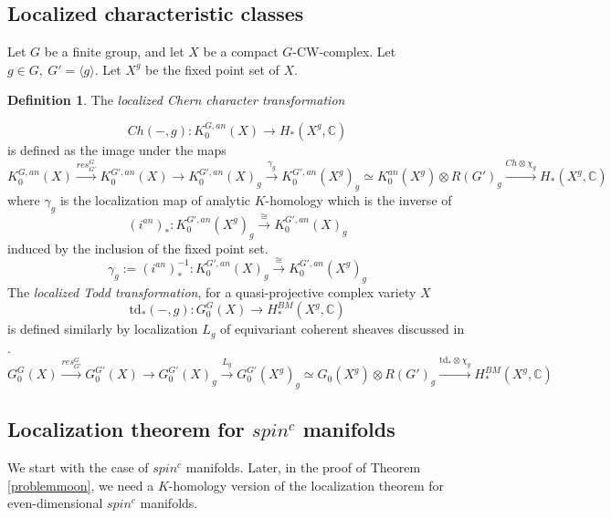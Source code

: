\documentclass[11pt,leqno,twoside]{amsart}
\theoremstyle{plainsl}
\theoremstyle{definition}
\newtheorem{definition}[theorem]{Definition}
\newcommand{\td}{\mathrm{td}}
\begin{document}
\subsection{Localized characteristic classes}


Let $G$ be a finite group, and let $X$ be a compact $G$-CW-complex. Let $g\in G,\:G'=\langle g\rangle$. Let $X^g$ be the fixed point set of $X$.
\begin{definition}\cite{A} \label{localizedchernclass} The \textit{localized Chern character transformation}

\[Ch(-,g):K_0^{G,an}(X) \rightarrow H_*(X^g,\mathbb{C})\]
is defined as the image under the maps
\[K_0^{G,an}(X)\xrightarrow{res^G_{G'}} K_0^{G',an}(X)\rightarrow K_0^{G',an}(X)_{{g}}\xrightarrow[]{\gamma_{{g}}}K_0^{G',an}(X^g)_{g}\simeq K_0^{an}(X^g) \otimes R(G')_{g}\xrightarrow{Ch\otimes \chi_g}H_*(X^g,\mathbb{C})\]
where $\gamma_g$ is the localization map of analytic $K$-homology \cite{BLP} which is
 the inverse of $$(i^{an})_*:K_0^{G',an}(X^g)_{g} \xrightarrow[]{\cong} K_0^{G',an}(X)_{{g}}$$ induced by the inclusion of the fixed point set.
\[\gamma_{{g}}:=(i^{an})_*^{-1}:K_0^{G',an}(X)_{{g}}\xrightarrow[]{\cong}K_0^{G',an}(X^g)_{g}\]
The \textit{localized Todd transformation}, for a quasi-projective complex variety $X$
\[\td_{*}(-,g):G_0^{G}(X) \rightarrow H^{BM}_*(X^g,\mathbb{C})\]
is defined similarly by localization $L_g$ of equivariant coherent sheaves discussed in  \cite{BFQ,Q79}.
\[G_0^{G}(X)\xrightarrow{res^G_{G'}} G_0^{G'}(X)\rightarrow G_0^{G'}(X)_{{g}}\xrightarrow[]{L_{{g}}}G_0^{G'}(X^g)_{g}\simeq G_0(X^g) \otimes R(G')_{g}\xrightarrow{\td_{*}\otimes \chi_g}  H^{BM}_*(X^g,\mathbb{C})\]
\end{definition}



\subsection{Localization theorem for $spin^c$ manifolds}\label{spinstuff} We start with the case of $spin^c$ manifolds. Later, in the proof of Theorem \ref{problemmoon}, we need a $K$-homology version of the localization theorem for even-dimensional $spin^c$ manifolds.
\end{document}
